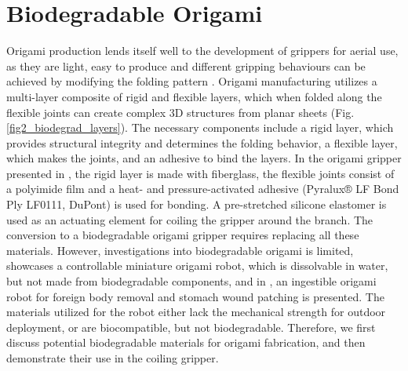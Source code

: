 \section{Biodegradable Origami}
Origami production lends itself well to the development of grippers for aerial use, as they are light, easy to produce and different gripping behaviours can be achieved by modifying the folding pattern \cite{Rus2018, Mintchev2018, Kim2018c}. Origami manufacturing utilizes a multi-layer composite of rigid and flexible layers, which when folded along the flexible joints can create complex 3D structures from planar sheets (Fig. \ref{fig2_biodegrad_layers}). The necessary components include a rigid layer, which provides structural integrity and determines the folding behavior, a flexible layer, which makes the joints, and an adhesive to bind the layers. In the origami gripper presented in \cite{Geckeler2022a}, the rigid layer is made with fiberglass, the flexible joints consist of a polyimide film and a heat- and pressure-activated adhesive (Pyralux® LF Bond Ply LF0111, DuPont) is used for bonding. A pre-stretched silicone elastomer is used as an actuating element for coiling the gripper around the branch. The conversion to a biodegradable origami gripper requires replacing all these materials. However, investigations into biodegradable origami is limited, \cite{Miyashita2015} showcases a controllable miniature origami robot, which is dissolvable in water, but not made from biodegradable components, and in \cite{Miyashita2016}, an ingestible origami robot for foreign body removal and stomach wound patching is presented. The materials utilized for the robot either lack the mechanical strength for outdoor deployment, or are biocompatible, but not biodegradable. Therefore, we first discuss potential biodegradable materials for origami fabrication, and then demonstrate their use in the coiling gripper.
